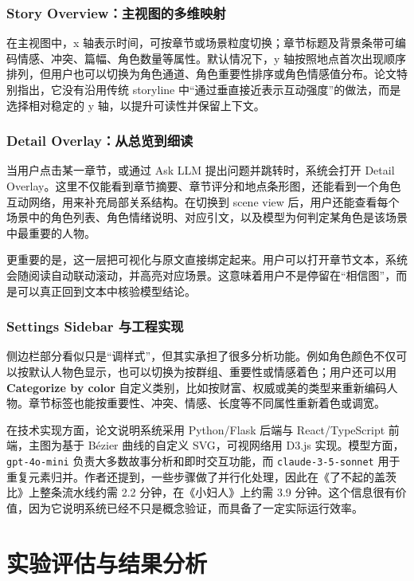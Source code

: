 \documentclass[a4paper,12pt,UTF8]{article}
\begin{document}
\subsubsection{Story Overview：主视图的多维映射}
在主视图中，x 轴表示时间，可按章节或场景粒度切换；章节标题及背景条带可编码情感、冲突、篇幅、角色数量等属性。默认情况下，y 轴按照地点首次出现顺序排列，但用户也可以切换为角色通道、角色重要性排序或角色情感值分布。论文特别指出，它没有沿用传统 storyline 中“通过垂直接近表示互动强度”的做法，而是选择相对稳定的 y 轴，以提升可读性并保留上下文。

\subsubsection{Detail Overlay：从总览到细读}
当用户点击某一章节，或通过 Ask LLM 提出问题并跳转时，系统会打开 Detail Overlay。这里不仅能看到章节摘要、章节评分和地点条形图，还能看到一个角色互动网络，用来补充局部关系结构。在切换到 scene view 后，用户还能查看每个场景中的角色列表、角色情绪说明、对应引文，以及模型为何判定某角色是该场景中最重要的人物。

更重要的是，这一层把可视化与原文直接绑定起来。用户可以打开章节文本，系统会随阅读自动联动滚动，并高亮对应场景。这意味着用户不是停留在“相信图”，而是可以真正回到文本中核验模型结论。

\subsubsection{Settings Sidebar 与工程实现}
侧边栏部分看似只是“调样式”，但其实承担了很多分析功能。例如角色颜色不仅可以按默认人物色显示，也可以切换为按群组、重要性或情感着色；用户还可以用 \textbf{Categorize by color} 自定义类别，比如按财富、权威或美的类型来重新编码人物。章节标签也能按重要性、冲突、情感、长度等不同属性重新着色或调宽。

在技术实现方面，论文说明系统采用 Python/Flask 后端与 React/TypeScript 前端，主图为基于 Bézier 曲线的自定义 SVG，可视网络用 D3.js 实现。模型方面，\texttt{gpt-4o-mini} 负责大多数故事分析和即时交互功能，而 \texttt{claude-3-5-sonnet} 用于重复元素归并。作者还提到，一些步骤做了并行化处理，因此在《了不起的盖茨比》上整条流水线约需 2.2 分钟，在《小妇人》上约需 3.9 分钟。这个信息很有价值，因为它说明系统已经不只是概念验证，而具备了一定实际运行效率。

\section{实验评估与结果分析}
\end{document}
